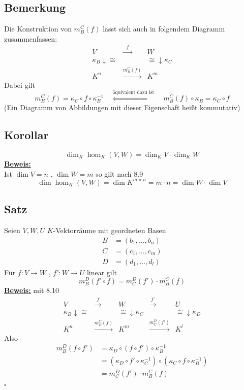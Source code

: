 \subsection{Bemerkung} %
\label{sub:bemerkung}
Die Konstruktion von $m_B^C (f)$ lässt sich auch in folgendem Diagramm zusammenfassen:
\[
	\begin{array}{ccc}
		V & \xrightarrow{\text{  } f \text{  }} & W \\
		\kappa_B \downarrow \cong & & \cong \downarrow \kappa_C \\
		K^n & \xrightarrow{m_B^C (f)} & K^m 
	\end{array}
\]
Dabei gilt
\[
	m_B^C(f) = \kappa_C \circ f \circ \kappa_B^{-1} \quad \overset{\text{äquivalent dazu ist}}{\Longleftrightarrow} \quad m_B^C (f) \circ \kappa_B = \kappa_C \circ f
\]
(Ein Diagramm von Abbildungen mit dieser Eigenschaft heißt kommutativ)

\subsection{Korollar} %
\label{sub:korollar}
\[
	\dim_K \hom_K (V,W) = \dim_K V \cdot \dim_K W
\]
\underline{\textbf{Beweis:}} \\
Ist $\dim V = n$ , $\dim W =m$ so gilt nach 8.9
\[
	\dim \hom_K (V,W) = \dim K^{m \times n} = m \cdot n = \dim W \cdot \dim V
\]

\subsection{Satz} %
\label{sub:satz}
Seien $V,W,U$ \(K\)-Vektorräume mit geordneten Basen
\begin{align*}
	B &= (b_1, \ldots , b_n)  \tag{von $V$}\\
	C &= (c_1, \ldots , c_m) \tag{von $W$}\\
	D &= (d_1, \ldots , d_l) \tag{von $U$}
\end{align*}
Für $f: V \to W$ , $f' : W \to U$ linear gilt
\[
	m_B^D(f' \circ f) = m_C^D (f') \cdot m_B^C (f)
\]
\underline{\textbf{Beweis:}} mit 8.10 \\
\[
	\begin{array}{ccccc}
		V & \xrightarrow{f} & W & \xrightarrow{f'} & U \\
		\kappa_B \downarrow \cong & & \cong \downarrow \kappa_C & & \cong \downarrow \kappa_D \\
		K^n & \xrightarrow{m_B^C(f)} & K^m & \xrightarrow{m_C^D(f')} & K^l  
	\end{array}
\]
Also
\begin{align*}
	m_B^D (f \circ f') &= \kappa_D \circ (f \circ f') \circ \kappa_B^{-1} \\
	&= ( \kappa_D \circ f' \circ \kappa_C^{-1}) \circ ( \kappa_C \circ f \circ \kappa_B^{-1}) \\
	&= m_C^D(f') \cdot m_B^C(f)
\end{align*}
\hfill \( \square \)

